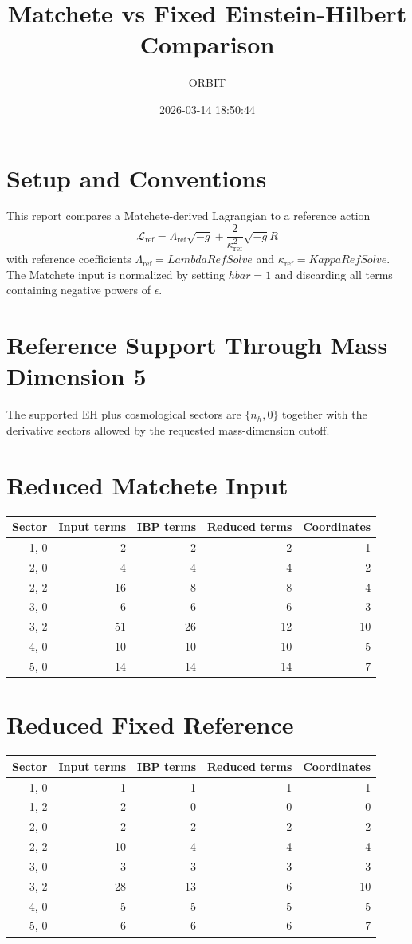 \documentclass[11pt]{article}
\title{Matchete vs Fixed Einstein-Hilbert Comparison}
\author{ORBIT}
\date{2026-03-14 18:50:44}
\begin{document}
\maketitle
\tableofcontents
\section{Setup and Conventions}
This report compares a Matchete-derived Lagrangian to a reference action
\begin{equation}
\mathcal{L}_{\mathrm{ref}} = \Lambda_{\mathrm{ref}} \sqrt{-g} + \frac{2}{\kappa_{\mathrm{ref}}^2} \sqrt{-g} R
\end{equation}
with reference coefficients $\Lambda_{\mathrm{ref}} = LambdaRefSolve$ and $\kappa_{\mathrm{ref}} = KappaRefSolve$.
The Matchete input is normalized by setting $hbar = 1$ and discarding all terms containing negative powers of $\epsilon$.
\section{Reference Support Through Mass Dimension 5}
The supported EH plus cosmological sectors are $\{n_h, 0\}$ together with the derivative sectors allowed by the requested mass-dimension cutoff.
\section{Reduced Matchete Input}
\begin{longtable}{rrrrr}
\toprule
Sector & Input terms & IBP terms & Reduced terms & Coordinates \\
\midrule
{1, 0} & 2 & 2 & 2 & 1 \\
{2, 0} & 4 & 4 & 4 & 2 \\
{2, 2} & 16 & 8 & 8 & 4 \\
{3, 0} & 6 & 6 & 6 & 3 \\
{3, 2} & 51 & 26 & 12 & 10 \\
{4, 0} & 10 & 10 & 10 & 5 \\
{5, 0} & 14 & 14 & 14 & 7 \\
\bottomrule
\end{longtable}
\section{Reduced Fixed Reference}
\begin{longtable}{rrrrr}
\toprule
Sector & Input terms & IBP terms & Reduced terms & Coordinates \\
\midrule
{1, 0} & 1 & 1 & 1 & 1 \\
{1, 2} & 2 & 0 & 0 & 0 \\
{2, 0} & 2 & 2 & 2 & 2 \\
{2, 2} & 10 & 4 & 4 & 4 \\
{3, 0} & 3 & 3 & 3 & 3 \\
{3, 2} & 28 & 13 & 6 & 10 \\
{4, 0} & 5 & 5 & 5 & 5 \\
{5, 0} & 6 & 6 & 6 & 7 \\
\bottomrule
\end{longtable}
\end{document}
